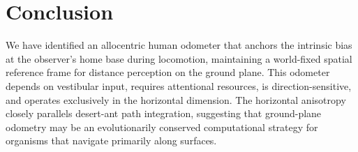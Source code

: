 \documentclass[11pt]{article}
\begin{document}
\section{Conclusion}

We have identified an allocentric human odometer that anchors the intrinsic bias at the observer's home base during locomotion, maintaining a world-fixed spatial reference frame for distance perception on the ground plane. This odometer depends on vestibular input, requires attentional resources, is direction-sensitive, and operates exclusively in the horizontal dimension. The horizontal anisotropy closely parallels desert-ant path integration, suggesting that ground-plane odometry may be an evolutionarily conserved computational strategy for organisms that navigate primarily along surfaces.



\end{document}
